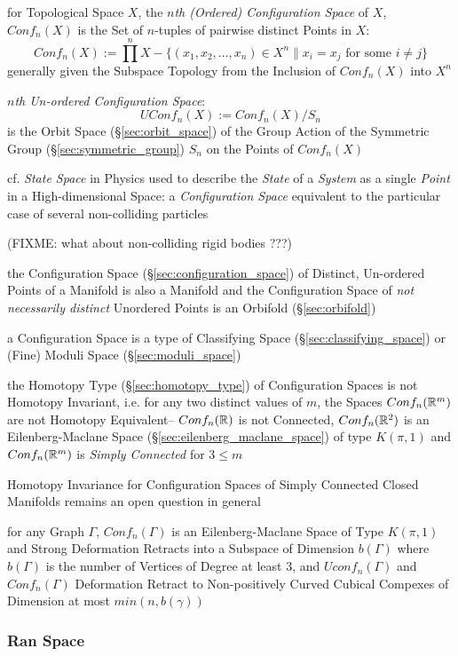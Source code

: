 for Topological Space $X$, the \emph{$n$th (Ordered) Configuration Space} of
$X$, $Conf_n(X)$ is the Set of $n$-tuples of pairwise distinct Points in $X$:
\[
  Conf_n(X) := \prod^n X - \{(x_1, x_2, \ldots, x_n) \in X^n
    \| x_i = x_j \text{ for some } i \neq j \}
\]
generally given the Subspace Topology from the Inclusion of $Conf_n(X)$ into
$X^n$

\emph{$n$th Un-ordered Configuration Space}:
\[
  UConf_n(X) := Conf_n(X)/S_n
\]
is the Orbit Space (\S\ref{sec:orbit_space}) of the Group Action of the
Symmetric Group (\S\ref{sec:symmetric_group}) $S_n$ on the Points of $Conf_n(X)$

cf. \emph{State Space} in Physics used to describe the \emph{State} of a
\emph{System} as a single \emph{Point} in a High-dimensional Space: a
\emph{Configuration Space} equivalent to the particular case of several
non-colliding particles

(FIXME: what about non-colliding rigid bodies ???)

the Configuration Space (\S\ref{sec:configuration_space}) of Distinct,
Un-ordered Points of a Manifold is also a Manifold and the Configuration Space
of \emph{not necessarily distinct} Unordered Points is an Orbifold
(\S\ref{sec:orbifold})

a Configuration Space is a type of Classifying Space
(\S\ref{sec:classifying_space}) or (Fine) Moduli Space
(\S\ref{sec:moduli_space})

the Homotopy Type (\S\ref{sec:homotopy_type}) of Configuration Spaces is not
Homotopy Invariant, i.e. for any two distinct values of $m$, the Spaces
$Conf_n(\mathbb{R}^m)$ are not Homotopy Equivalent-- $Conf_n(\mathbb{R})$ is not
Connected, $Conf_n(\mathbb{R}^2)$ is an Eilenberg-Maclane Space
(\S\ref{sec:eilenberg_maclane_space}) of type $K(\pi,1)$ and $Conf_n(\mathbb{R}^m)$
is \emph{Simply Connected} for $3 \leq m$

Homotopy Invariance for Configuration Spaces of Simply Connected Closed
Manifolds remains an open question in general

for any Graph $\Gamma$, $Conf_n(\Gamma)$ is an Eilenberg-Maclane Space of Type
$K(\pi,1)$ and Strong Deformation Retracts into a Subspace of Dimension
$b(\Gamma)$ where $b(\Gamma)$ is the number of Vertices of Degree at least 3,
and $Uconf_n(\Gamma)$ and $Conf_n(\Gamma)$ Deformation Retract to
Non-positively Curved Cubical Compexes of Dimension at most $min(n,b(\gamma))$



\subsubsection{Ran Space}\label{sec:ran_space}

